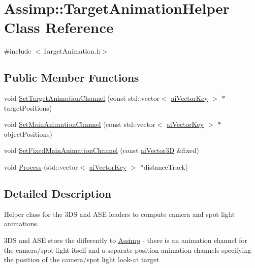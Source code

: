\hypertarget{class_assimp_1_1_target_animation_helper}{\section{Assimp\+:\+:Target\+Animation\+Helper Class Reference}
\label{class_assimp_1_1_target_animation_helper}
}


{\ttfamily \#include $<$Target\+Animation.\+h$>$}

\subsection*{Public Member Functions}
\begin{DoxyCompactItemize}
\item 
void \hyperlink{class_assimp_1_1_target_animation_helper_adbd998aa26b930a34816501f5f82353b}{Set\+Target\+Animation\+Channel} (const std\+::vector$<$ \hyperlink{structai_vector_key}{ai\+Vector\+Key} $>$ $\ast$target\+Positions)
\item 
void \hyperlink{class_assimp_1_1_target_animation_helper_ab935313719faca1e82acf261411c8074}{Set\+Main\+Animation\+Channel} (const std\+::vector$<$ \hyperlink{structai_vector_key}{ai\+Vector\+Key} $>$ $\ast$object\+Positions)
\item 
void \hyperlink{class_assimp_1_1_target_animation_helper_aaefa9d86bdfaa12005ce208844457ac0}{Set\+Fixed\+Main\+Animation\+Channel} (const \hyperlink{structai_vector3_d}{ai\+Vector3\+D} \&fixed)
\item 
void \hyperlink{class_assimp_1_1_target_animation_helper_a49bed0b2415d5202dbab4f597e2c95d3}{Process} (std\+::vector$<$ \hyperlink{structai_vector_key}{ai\+Vector\+Key} $>$ $\ast$distance\+Track)
\end{DoxyCompactItemize}


\subsection{Detailed Description}
Helper class for the 3\+D\+S and A\+S\+E loaders to compute camera and spot light animations.

3\+D\+S and A\+S\+E store the differently to \hyperlink{class_assimp}{Assimp} -\/ there is an animation channel for the camera/spot light itself and a separate position animation channels specifying the position of the camera/spot light look-\/at target 

